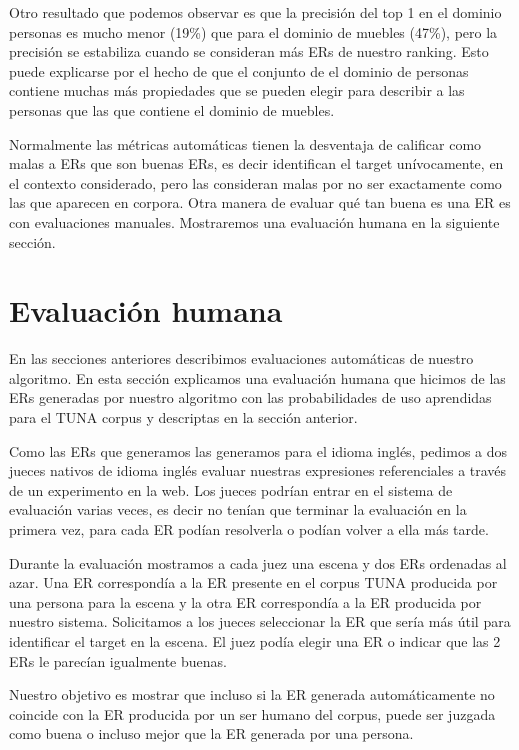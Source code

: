 Otro resultado que podemos observar es que la precisi\'on  del top 1 en el dominio personas es mucho menor (19\%) que para el dominio de muebles (47\%), pero la precisi\'on se estabiliza cuando se consideran m\'as ERs de nuestro ranking. Esto puede explicarse por el hecho de que el conjunto de el dominio de personas contiene muchas m\'as propiedades que se pueden elegir para describir a las personas que las que contiene el dominio de muebles.

Normalmente las m\'etricas autom\'aticas tienen la desventaja de calificar como malas a ERs que son buenas ERs, es decir identifican el target un\'ivocamente, en el contexto considerado, pero las consideran malas por no ser exactamente como las que aparecen en corpora. Otra manera de evaluar qu\'e tan buena es una ER es con evaluaciones manuales. Mostraremos una evaluaci\'on humana en la siguiente secci\'on.

 
\section{Evaluaci\'on humana} \label{sec:humanevaluation}

En las secciones anteriores describimos evaluaciones autom\'aticas de nuestro algoritmo. En esta secci\'on explicamos una evaluaci\'on humana que hicimos de las ERs generadas por nuestro algoritmo con las probabilidades de uso aprendidas para el TUNA corpus y descriptas en la secci\'on anterior.  

Como las ERs que generamos las generamos para el idioma ingl\'es, pedimos a dos jueces nativos de idioma ingl\'es evaluar nuestras expresiones referenciales a trav\'es de un experimento en la web. Los jueces podr\'{i}an entrar en el sistema de evaluaci\'on varias veces, es decir no ten\'ian que terminar la evaluaci\'on en la primera vez, para cada ER pod\'ian resolverla o pod\'ian volver a ella m\'as tarde. 

Durante la evaluaci\'on mostramos a cada juez una escena y dos ERs ordenadas al azar. Una ER correspond\'ia a la ER presente en el corpus TUNA producida por una persona para la escena y la otra ER correspond\'ia a la ER producida por nuestro sistema. Solicitamos a los jueces seleccionar la ER que ser\'{i}a m\'as \'util para identificar el target en la escena. El juez pod\'ia elegir una ER o indicar que las 2 ERs le parec\'ian igualmente buenas.

Nuestro objetivo es mostrar que incluso si la ER generada autom\'aticamente no coincide con la ER producida por un ser humano del corpus, puede ser juzgada como buena o incluso mejor que la ER generada por una persona.

